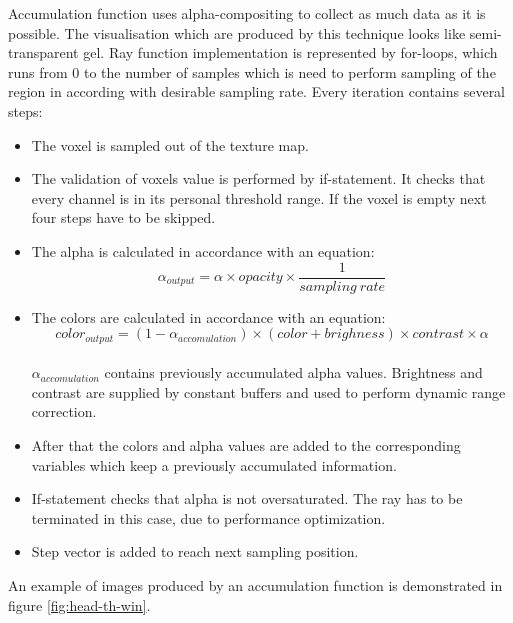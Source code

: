 \documentclass[twoside, english, 11pt]{report}
\begin{document}
Accumulation function uses alpha-compositing to collect as much data as it is possible. The visualisation which are produced by this technique looks like semi-transparent gel. Ray function implementation is represented by for-loops, which runs from 0 to the number of samples which is need to perform sampling of the region in according with desirable sampling rate. Every iteration contains several steps:
\begin{itemize}
\item The voxel is sampled out of the texture map.
\item The validation of voxels value is performed by if-statement. It checks that every channel is in its personal threshold range. If the voxel is empty next four steps have to be skipped.
\item The alpha is calculated in accordance with an equation:
\begin{equation} \label{eq:alpha}
\alpha_{output} = \alpha \times opacity \times \frac {1}{{sampling\ rate}}
\end{equation}

\item The colors are calculated in accordance with an equation:
\begin{equation} \label{eq:color}
color_{output} = (1 - \alpha_{accomulation}) \times (color + brighness) \times contrast  \times \alpha
\end{equation}\\

$\alpha_{accomulation}$ contains previously accumulated alpha values. Brightness and contrast are supplied by constant buffers and used to perform dynamic range correction.
\item After that the colors and alpha values are added to the corresponding variables which keep a previously accumulated information.
\item If-statement checks that alpha is not oversaturated. The ray has to be terminated in this case, due to performance optimization.
\item Step vector is added to reach next sampling position.
\end{itemize}

An example of images produced by an accumulation function is demonstrated in figure \ref{fig:head-th-win}. \\
\end{document}
